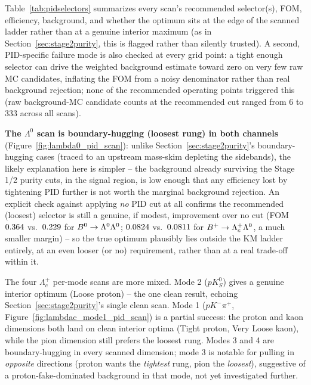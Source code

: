 Table~\ref{tab:pidselectors} summarizes every scan's recommended
selector(s), FOM, efficiency, background, and whether the optimum sits at
the edge of the scanned ladder rather than at a genuine interior maximum
(as in Section~\ref{sec:stage2purity}, this is flagged rather than silently
trusted). A second, PID-specific failure mode is also checked at every grid
point: a tight enough selector can drive the weighted background estimate
toward zero on very few raw MC candidates, inflating the FOM from a noisy
denominator rather than real background rejection; none of the recommended
operating points triggered this (raw background-MC candidate counts at the
recommended cut ranged from 6 to 333 across all scans).



\textbf{The $\Lambda^0$ scan is boundary-hugging (loosest rung) in both
channels} (Figure~\ref{fig:lambda0_pid_scan}): unlike
Section~\ref{sec:stage2purity}'s boundary-hugging cases (traced to an
upstream mass-skim depleting the sidebands), the likely explanation here is
simpler -- the background already surviving the Stage 1/2 purity cuts, in
the signal region, is low enough that any efficiency lost by tightening PID
further is not worth the marginal background rejection. An explicit check
against applying \emph{no} PID cut at all confirms the recommended (loosest)
selector is still a genuine, if modest, improvement over no cut
(FOM~$0.364$ vs.\ $0.229$ for
$B^0\rightarrow\Lambda^0\Lambda^0$; $0.0824$ vs.\
$0.0811$ for $B^+\rightarrow\Lambda_c^+\Lambda^0$, a much
smaller margin) -- so the true optimum plausibly lies outside the KM ladder
entirely, at an even looser (or no) requirement, rather than at a real
trade-off within it.

The four $\Lambda_c^+$ per-mode scans are more mixed. Mode 2 ($pK_S^0$)
gives a genuine interior optimum (Loose proton) -- the one clean result,
echoing Section~\ref{sec:stage2purity}'s single clean scan. Mode 1
($pK^-\pi^+$, Figure~\ref{fig:lambdac_mode1_pid_scan}) is a partial success:
the proton and kaon dimensions both land on clean interior optima (Tight
proton, Very Loose kaon), while the pion dimension still prefers the
loosest rung. Modes 3 and 4 are boundary-hugging in every scanned dimension;
mode 3 is notable for pulling in \emph{opposite} directions (proton wants
the \emph{tightest} rung, pion the \emph{loosest}), suggestive of a
proton-fake-dominated background in that mode, not yet investigated further.

